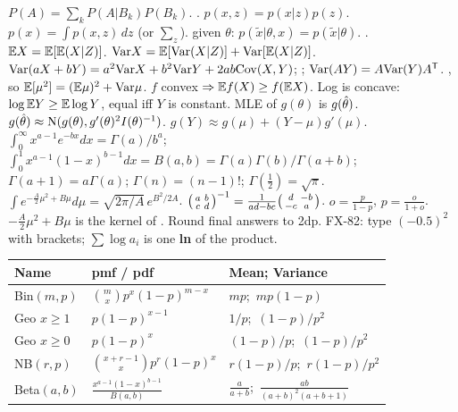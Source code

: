   $P(A)=\sum_k P(A|B_k)P(B_k)$.  .  $p(x,z)=p(x|z)p(z)$.  $p(x)=\int p(x,z)\,dz$ (or $\sum_z$).  given $\theta$: $p(\tilde x|\theta,x)=p(\tilde x|\theta)$.  .
\sk{} $\mathbb{E} X=\mathbb{E}[\mathbb{E}(X|Z)]$.  $\mathrm{Var} X=\mathbb{E}[\mathrm{Var}(X|Z)]+\mathrm{Var}[\mathbb{E}(X|Z)]$.  $\mathrm{Var}(aX+bY)=a^2\mathrm{Var} X+b^2\mathrm{Var} Y+2ab\mathrm{Cov}(X,Y)$; ; $\mathrm{Var}(AY)=A\mathrm{Var}(Y)A^{\mathsf T}$.
\sk{} , so $\mathbb{E}[\mu^2]=(\mathbb{E}\mu)^2+\mathrm{Var}\mu$.
\sk{} $f$ convex $\Rightarrow\mathbb{E} f(X)\ge f(\mathbb{E} X)$. Log is concave: $\log\mathbb{E} Y\ge\mathbb{E}\log Y$, equal iff $Y$ is constant.
\sk{} MLE of $g(\theta)$ is $g(\hat{\theta})$.  $g(\hat{\theta})\approx\mathrm{N}(g(\theta),g'(\theta)^2I(\theta)^{-1})$.  $g(Y)\approx g(\mu)+(Y-\mu)g'(\mu)$.
\sk{} $\int_0^\infty x^{a-1}e^{-bx}dx=\Gamma(a)/b^a$; $\int_0^1x^{a-1}(1-x)^{b-1}dx=B(a,b)=\Gamma(a)\Gamma(b)/\Gamma(a+b)$; $\Gamma(a+1)=a\Gamma(a)$; $\Gamma(n)=(n-1)!$; $\Gamma(\tfrac12)=\sqrt\pi$.  $\int e^{-\frac A2\mu^2+B\mu}d\mu=\sqrt{2\pi/A}\,e^{B^2/2A}$.
\sk{} $\begin{psmallmatrix}a&b\\c&d\end{psmallmatrix}^{-1}=\frac1{ad-bc}\begin{psmallmatrix}d&-b\\-c&a\end{psmallmatrix}$.  $o=\frac p{1-p}$, $p=\frac o{1+o}$.
\sk{} $-\frac A2\mu^2+B\mu$ is the kernel of .  Round final answers to 2dp. FX-82: type $(-0.5)^2$ with brackets; $\sum\log a_i$ is one \textbf{ln} of the product.
\bx
{}\par
{\renewcommand{\arraystretch}{1.08}%
\begin{tabular}{@{}|p{25pt}|p{50pt}|p{53pt}|@{}}\hline
\rowcolor{hdr}Name&pmf / pdf&Mean; Variance\\\hline
Bin$(m,p)$&$\binom mxp^x(1-p)^{m-x}$&$mp$;\ $mp(1-p)$\\\hline
Geo $x{\ge}1$&$p(1-p)^{x-1}$&$1/p$;\ $(1{-}p)/p^2$\\\hline
Geo $x{\ge}0$&$p(1-p)^x$&$(1{-}p)/p$;\ $(1{-}p)/p^2$\\\hline
NB$(r,p)$&$\binom{x+r-1}{x}p^r(1-p)^x$&$r(1{-}p)/p$;\ $r(1{-}p)/p^2$\\\hline
Beta$(a,b)$&$\frac{x^{a-1}(1-x)^{b-1}}{B(a,b)}$&$\frac a{a+b}$;\ $\frac{ab}{(a+b)^2(a+b+1)}$\\\hline
\end{tabular}}
